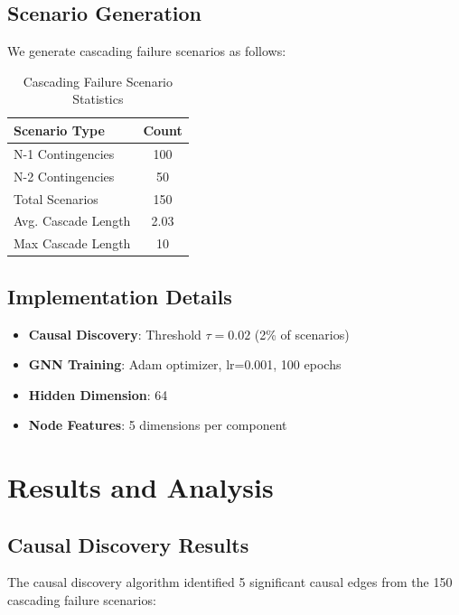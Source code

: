\documentclass[journal,12pt,onecolumn]{IEEEtran}
\begin{document}
\subsection{Scenario Generation}

We generate cascading failure scenarios as follows:

\begin{table}[htbp]
\caption{Cascading Failure Scenario Statistics}
\label{tab:scenarios}
\centering
\begin{tabular}{lc}
\toprule
\textbf{Scenario Type} & \textbf{Count} \\
\midrule
N-1 Contingencies & 100 \\
N-2 Contingencies & 50 \\
Total Scenarios & 150 \\
Avg. Cascade Length & 2.03 \\
Max Cascade Length & 10 \\
\bottomrule
\end{tabular}
\end{table}

\subsection{Implementation Details}

\begin{itemize}
    \item \textbf{Causal Discovery}: Threshold $\tau = 0.02$ (2\% of scenarios)
    \item \textbf{GNN Training}: Adam optimizer, lr=0.001, 100 epochs
    \item \textbf{Hidden Dimension}: 64
    \item \textbf{Node Features}: 5 dimensions per component
\end{itemize}

\section{Results and Analysis}
\label{sec:results}

\subsection{Causal Discovery Results}

The causal discovery algorithm identified 5 significant causal edges from the 150 cascading failure scenarios:
\end{document}
